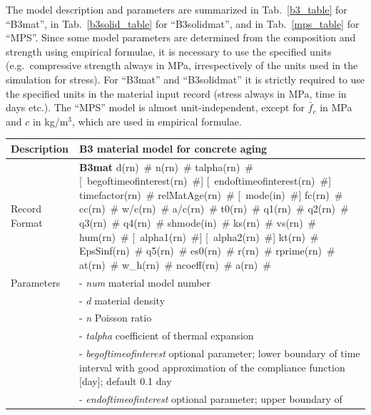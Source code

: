 \documentclass[a4paper]{article}
\newcommand{\descitem}[1]{{\noindent \bf #1}}
\newcommand{\elemparam}[2]{{{#1\tiny (#2)}~\#}}
\newcommand{\optelemparam}[2]{[{~\elemparam{#1}{#2}}]}
\newcommand{\param}[1]{{\it #1}}
\begin{document}
The model description and parameters are summarized
in Tab.~\ref{b3_table} for ``B3mat'', in Tab.~\ref{b3solid_table} for ``B3solidmat'', and in Tab.~\ref{mps_table} for ``MPS''. 
Since some model parameters are determined from the composition
and strength using empirical formulae, it is necessary to use the
specified units (e.g.\ compressive strength always in MPa, irrespectively
of the units used in the simulation for stress). 
For ``B3mat'' and ``B3solidmat'' it is strictly 
required to use the specified units in the material input record (stress always in MPa, time in days etc.). 
The ``MPS'' model is almost unit-independent, except for 
$\bar{f}_c$ in MPa and $c$ in kg/m$^3$, which are used in empirical formulae.


\begin{table}[!htb]
\begin{tabular}{|l|p{9cm}|}
\hline
Description & B3 material model  for concrete aging\\
\hline
Record Format & \descitem{B3mat}  \elemparam{d}{rn} \elemparam{n}{rn}
\elemparam{talpha}{rn} 
\optelemparam{begoftimeofinterest}{rn} \optelemparam{endoftimeofinterest}{rn} \elemparam{timefactor}{rn} \elemparam{relMatAge}{rn}
%
\optelemparam{mode}{in} 
\elemparam{fc}{rn} \elemparam{cc}{rn} \elemparam{w/c}{rn}
\elemparam{a/c}{rn} \elemparam{t0}{rn}
\elemparam{q1}{rn} \elemparam{q2}{rn} \elemparam{q3}{rn}
\elemparam{q4}{rn}
%
\elemparam{shmode}{in}
\elemparam{ks}{rn} \elemparam{vs}{rn} \elemparam{hum}{rn}
\optelemparam{alpha1}{rn} \optelemparam{alpha2}{rn} 
\elemparam{kt}{rn} \elemparam{EpsSinf}{rn} \elemparam{q5}{rn}
\elemparam{es0}{rn} \elemparam{r}{rn} \elemparam{rprime}{rn}
\elemparam{at}{rn}  
\elemparam{w\_h}{rn} \elemparam{ncoeff}{rn} \elemparam{a}{rn}
\\
Parameters &- \param{num} material model number\\
%
&- \param{d} material density\\
&- \param{n} Poisson ratio\\
&- \param{talpha} coefficient of thermal expansion\\
&- \param{begoftimeofinterest} optional parameter; lower boundary of
time interval with good approximation of the compliance function
[day]; default 0.1 day\\
&- \param{endoftimeofinterest} optional parameter; upper boundary of

\end{tabular}
\end{table}
\end{document}
